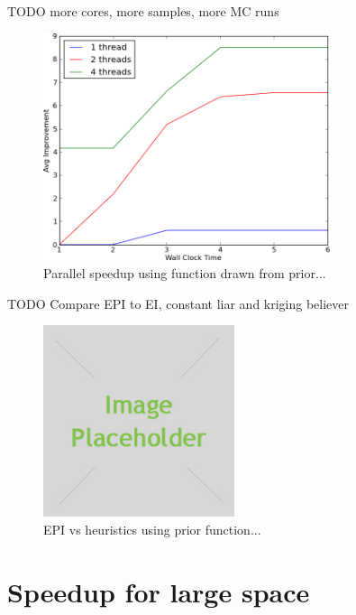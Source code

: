 \documentclass[phd,tocprelim]{cornell}
\begin{document}
TODO
more cores, more samples, more MC runs
\begin{figure}[hpt]
 	\centerline{\includegraphics[width=0.75\textwidth]{figures/EPI/GPP_timing.png}}
    \caption[Parallel speedup for function drawn from prior]{Parallel speedup using function drawn from prior...}
 	\label{fig:EPI_res1}
\end{figure}

TODO
Compare EPI to EI, constant liar and kriging believer
\begin{figure}[hpt]
 	\centerline{\includegraphics[width=0.5\textwidth]{figures/placeholder.jpg}}
    \caption[EPI vs heuristics using prior function]{EPI vs heuristics using prior function...}
 	\label{fig:EPI_res2}
\end{figure}

\section{Speedup for large space}
\end{document}
